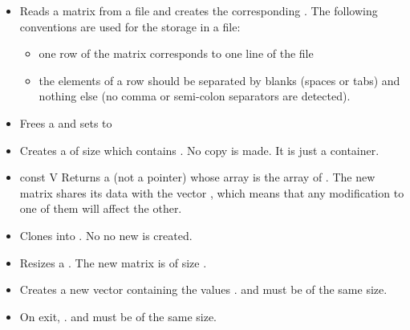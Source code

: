\begin{itemize}
\item {}
  \sshortdescribe Reads a matrix from a file and creates the corresponding
  . The following conventions are used for the storage in a
  file:
  \begin{itemize}
  \item one row of the matrix corresponds to one line of the file
  \item the elements of a row should be separated by blanks (spaces or tabs) and
    nothing else (no comma or semi-colon separators are detected).
  \end{itemize}

\item {}
  \sshortdescribe Frees a  and sets  to  
\item {}
    \sshortdescribe Creates a  of size  
    which contains . No copy is made. It is just a container.
\item {}
  {const  \ptr V}
  \sshortdescribe Returns a  (not a pointer) whose array is
  the array of . The new matrix shares its data with the
  vector , which means that any modification to one of them will affect
  the other.


\item {}
  \sshortdescribe Clones  into . No no new
   is created.

\item {}
  \sshortdescribe Resizes a . The new matrix is of size
  .  
\item {}
  \sshortdescribe Creates a new vector containing the values .  and  must be of the same size.

\item {}
  \sshortdescribe On exit, .  and
   must be of the same size.


\end{itemize}
